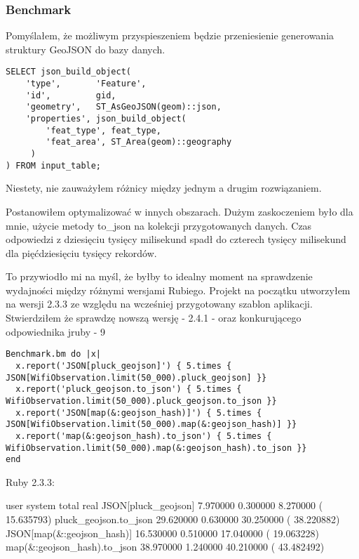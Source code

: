\subsubsection{Benchmark}

Pomyślałem, że możliwym przyspieszeniem będzie przeniesienie generowania struktury GeoJSON do bazy danych.

\begin{lstlisting}[caption=Ruby geojson\_hash]
SELECT json_build_object(
    'type',       'Feature',
    'id',         gid,
    'geometry',   ST_AsGeoJSON(geom)::json,
    'properties', json_build_object(
        'feat_type', feat_type,
        'feat_area', ST_Area(geom)::geography
     )
) FROM input_table;
\end{lstlisting}

Niestety, nie zauważyłem różnicy między jednym a drugim rozwiązaniem.


Postanowiłem optymalizować w innych obszarach. Dużym zaskoczeniem było dla mnie, użycie metody to_json na kolekcji przygotowanych danych. Czas odpowiedzi z dziesięciu tysięcy milisekund spadł do czterech tysięcy milisekund dla pięćdziesięciu tysięcy rekordów.


To przywiodło mi na myśl, że byłby to idealny moment na sprawdzenie wydajności między różnymi wersjami Rubiego. Projekt na początku utworzyłem na wersji 2.3.3 ze względu na wcześniej przygotowany szablon aplikacji. Stwierdziłem że sprawdzę nowszą wersję - 2.4.1 - oraz konkurującego odpowiednika jruby - 9

\begin{lstlisting}[caption=Benchmark geojson]
Benchmark.bm do |x|
  x.report('JSON[pluck_geojson]') { 5.times { JSON[WifiObservation.limit(50_000).pluck_geojson] }}
  x.report('pluck_geojson.to_json') { 5.times {  WifiObservation.limit(50_000).pluck_geojson.to_json }}
  x.report('JSON[map(&:geojson_hash)]') { 5.times {  JSON[WifiObservation.limit(50_000).map(&:geojson_hash)] }}
  x.report('map(&:geojson_hash).to_json') { 5.times {  WifiObservation.limit(50_000).map(&:geojson_hash).to_json }}
end
\end{lstlisting}

Ruby 2.3.3:

       user     system      total        real
JSON[pluck_geojson]  7.970000   0.300000   8.270000 ( 15.635793)
pluck_geojson.to_json 29.620000   0.630000  30.250000 ( 38.220882)
JSON[map(&:geojson_hash)] 16.530000   0.510000  17.040000 ( 19.063228)
map(&:geojson_hash).to_json 38.970000   1.240000  40.210000 ( 43.482492)

